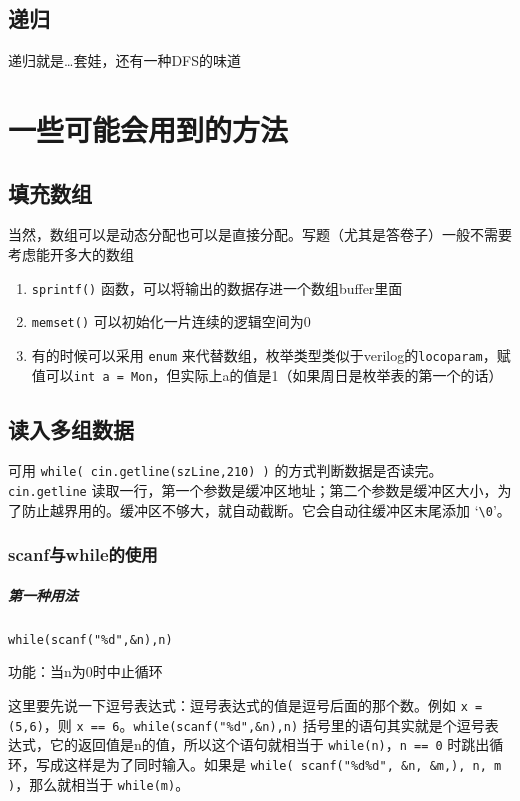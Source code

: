 \documentclass[]{report}
\begin{document}
	\section{递归}
		递归就是\dots 套娃，还有一种DFS的味道

	\chapter{一些可能会用到的方法}
	\section{填充数组}
		当然，数组可以是动态分配也可以是直接分配。写题（尤其是答卷子）一般不需要考虑能开多大的数组
		\begin{enumerate}
			\item \verb|sprintf()| 函数，可以将输出的数据存进一个数组buffer里面
			\item \verb|memset()| 可以初始化一片连续的逻辑空间为0
			\item 有的时候可以采用 \verb|enum| 来代替数组，枚举类型类似于verilog的\verb|locoparam|，赋值可以\verb|int a = Mon|，但实际上a的值是1（如果周日是枚举表的第一个的话）
		\end{enumerate}
	\section{读入多组数据}
		可用 \verb|while( cin.getline(szLine,210) )| 的方式判断数据是否读完。\newline\texttt{cin.getline} 读取一行，第一个参数是缓冲区地址；第二个参数是缓冲区大小，为了防止越界用的。缓冲区不够大，就自动截断。它会自动往缓冲区末尾添加 `\texttt{\textbackslash 0}'。
		\subsection{scanf与while的使用}
		\paragraph{第一种用法} \verb|while(scanf("%d",&n),n)|\par
			功能：当n为0时中止循环\par
			这里要先说一下逗号表达式：逗号表达式的值是逗号后面的那个数。例如 \verb|x = (5,6)|，则 \verb|x == 6|。\verb|while(scanf("%d",&n),n)| 括号里的语句其实就是个逗号表达式，它的返回值是n的值，所以这个语句就相当于 \verb|while(n)|，\verb|n == 0| 时跳出循环，写成这样是为了同时输入。如果是 \verb|while( scanf("%d%d", &n, &m,), n, m )|，那么就相当于 \verb|while(m)|。
\end{document}
